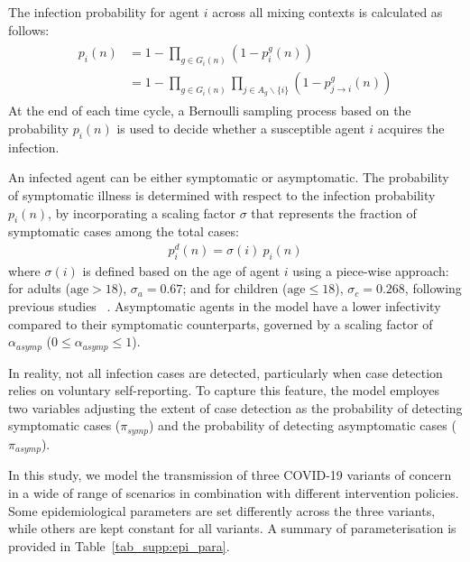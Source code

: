 \documentclass{article}
\begin{document}
\begin{appendices}
The infection probability for agent $i$  across all mixing contexts is calculated as follows:
\begin{eqnarray}
\begin{aligned}
    p_i(n)  &= 1 - \prod_{g \in G_i(n)} \left( 1 - p^g_i(n) \right) \\
            &= 1 - \prod_{g \in G_i(n)} \prod_{j \in A_g\backslash\{i\}} \left( 1 - p^g_{j \rightarrow i}(n) \right)
\end{aligned}
\label{eq:general_infection_prob}
\end{eqnarray}
At the end of each time cycle, a Bernoulli sampling process based on the probability $p_i(n)$ is used to decide whether a susceptible agent $i$ acquires the infection.

An infected agent can be either symptomatic or asymptomatic. The probability of symptomatic illness is determined with respect to the infection probability $p_i(n)$, by incorporating a scaling factor $\sigma$ that represents the fraction of symptomatic cases among the total cases:
\begin{eqnarray}
    p_i^d(n) = \sigma(i) \ p_i(n)
    \label{eq:infection_prob_symptomatic}
\end{eqnarray}
where $\sigma(i)$ is defined based on the age of  agent $i$ using a piece-wise approach: for adults ($\text{age} > 18$), $\sigma_a = 0.67$;  and for children ($\text{age} \leq 18$), $\sigma_c = 0.268$, following previous studies ~\cite{chang_modelling_2020,zachreson_how_2021,chang_simulating_2022,chang_persistence_2023}.
Asymptomatic agents in the model have a lower infectivity compared to their symptomatic counterparts, governed by a scaling factor of $\alpha_{asymp}$ ($0 \leq \alpha_{asymp} \leq 1$).

In reality, not all infection cases are detected, particularly when case detection relies on voluntary self-reporting. To capture this feature, the  model employes two variables adjusting the extent of case detection as the probability of detecting symptomatic cases ($\pi_{symp}$) and the probability of detecting asymptomatic cases ($\pi_{asymp}$).

In this study, we model the transmission of three COVID-19 variants of concern in a wide of range of scenarios in combination with different intervention policies. Some epidemiological parameters are set differently across the three variants, while others are kept constant for all  variants. A summary of parameterisation is provided in Table~\ref{tab_supp:epi_para}.


\end{appendices}
\end{document}
